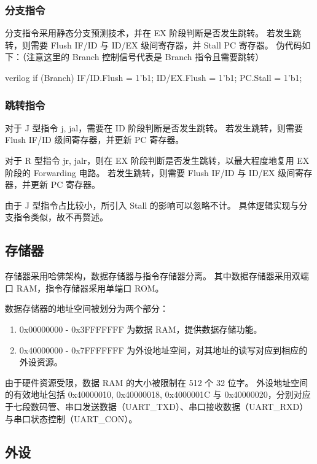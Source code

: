 \documentclass[a4paper]{article}  %
\begin{document}
\subsubsection{分支指令}
分支指令采用静态分支预测技术，并在 EX 阶段判断是否发生跳转。
若发生跳转，则需要 Flush IF/ID 与 ID/EX 级间寄存器，并 Stall PC 寄存器。
伪代码如下：（注意这里的 Branch 控制信号代表是 Branch 指令且需要跳转）

\begin{codeblock}{verilog}
    if (Branch) {
        IF/ID.Flush = 1'b1;
        ID/EX.Flush = 1'b1;
        PC.Stall = 1'b1;
    }
\end{codeblock}

\subsubsection{跳转指令}

对于 J 型指令 j, jal，需要在 ID 阶段判断是否发生跳转。
若发生跳转，则需要 Flush IF/ID 级间寄存器，并更新 PC 寄存器。

对于 R 型指令 jr, jalr，则在 EX 阶段判断是否发生跳转，以最大程度地复用 EX 阶段的 Forwarding 电路。
若发生跳转，则需要 Flush IF/ID 与 ID/EX 级间寄存器，并更新 PC 寄存器。

由于 J 型指令占比较小，所引入 Stall 的影响可以忽略不计。
具体逻辑实现与分支指令类似，故不再赘述。

\subsection{存储器}

存储器采用哈佛架构，数据存储器与指令存储器分离。
其中数据存储器采用双端口 RAM，指令存储器采用单端口 ROM。

数据存储器的地址空间被划分为两个部分：

\begin{enumerate}[A]
    \item 0x00000000 - 0x3FFFFFFF 为数据 RAM，提供数据存储功能。
    \item 0x40000000 - 0x7FFFFFFF 为外设地址空间，对其地址的读写对应到相应的外设资源。
\end{enumerate}

由于硬件资源受限，数据 RAM 的大小被限制在 512 个 32 位字。
外设地址空间的有效地址包括 0x40000010, 0x40000018, 0x4000001C 与 0x40000020，分别对应于七段数码管、串口发送数据（UART\_TXD）、串口接收数据（UART\_RXD）与串口状态控制（UART\_CON）。

\subsection{外设}
\end{document}
